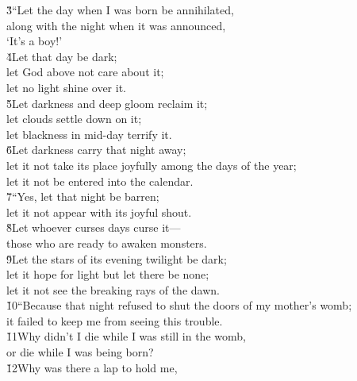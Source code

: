 \begin{poetry}
\poeml \v{3}``Let the day when I was born be annihilated, \\
\poemll    along with the night when it was announced, \\
\poemlll       `It's a boy!' \\
\poeml \v{4}Let that day be dark; \\
\poemll    let God above not care about it; \\
\poemlll       let no light shine over it. \\
\poeml \v{5}Let darkness and deep gloom reclaim it; \\
\poemll    let clouds settle down on it; \\
\poemlll       let blackness in mid-day terrify it. \\
\poeml \v{6}Let darkness carry that night away; \\
\poemll    let it not take its place joyfully among the days of the year; \\
\poemlll       let it not be entered into the calendar. \\
\poeml \v{7}``Yes, let that night be barren; \\
\poemll    let it not appear with its joyful shout. \\
\poeml \v{8}Let whoever curses days curse it--- \\
\poemll    those who are ready to awaken monsters. \\
\poeml \v{9}Let the stars of its evening twilight be dark; \\
\poemll    let it hope for light but let there be none; \\
\poemlll       let it not see the breaking rays of the dawn. \\
\poeml \v{10}``Because that night refused to shut the doors of my mother's womb; \\
\poemll    it failed to keep me from seeing this trouble. \\
\poeml \v{11}Why didn't I die while I was still in the womb, \\
\poemll    or die while I was being born? \\
\poeml \v{12}Why was there a lap to hold me, \\

\end{poetry}
